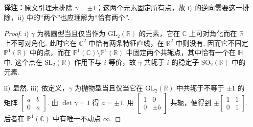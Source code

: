 \noindent\textbf{译注：}原文引理未排除 $\gamma=\pm1$；这两个元素固定所有点，故 i) 的逆向需要这一排除，ii) 中的``两个''也应理解为``恰有两个''.
\begin{proof}
i) $\gamma$ 为椭圆型当且仅当作为 $\mathrm{GL}_2(\mathbb R)$ 的元素，它在 $\mathbb C$ 上可对角化而在 $\mathbb R$ 上不可对角化. 此时它在 $\mathbb C^2$ 中恰有两条特征直线，在 $\mathbb R^2$ 中则没有. 因而它不固定 $\mathbb P^1(\mathbb R)$ 中的点，而在 $\mathbb P^1(\mathbb C)\setminus\mathbb P^1(\mathbb R)$ 中固定两个共轭点，其中恰有一个在 $\mathbb H$ 中. 这个点在 $\mathrm{SL}_2(\mathbb R)$ 作用下与 $i$ 等价，故 $\gamma$ 共轭于 $i$ 的稳定子 $\mathrm{SO}_2(\mathbb R)$ 中的元素.

ii) 显然. iii) 依定义，$\gamma$ 为抛物型当且仅当它在 $\mathrm{GL}_2(\mathbb R)$ 中共轭于不等于 $\pm1$ 的矩阵 $\left[\begin{smallmatrix}a&b\\0&a\end{smallmatrix}\right]$. 由 $\det\gamma=1$ 得 $a=\pm1$. 用 $\left[\begin{smallmatrix}1&0\\0&\pm b\end{smallmatrix}\right]$ 共轭，便得到 $\pm\left[\begin{smallmatrix}1&1\\0&1\end{smallmatrix}\right]$. 后者在 $\mathbb P^1(\mathbb C)$ 中有唯一不动点 $\infty$.
\end{proof}

